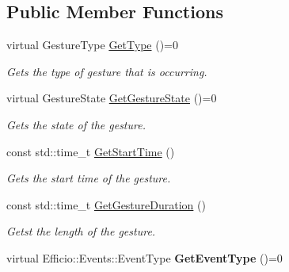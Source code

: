 \subsection*{Public Member Functions}
\begin{DoxyCompactItemize}
\item 
virtual Gesture\+Type \hyperlink{class_efficio_1_1_input_recognition_1_1_gesture_a751d03fe2bc9d025da065cec22936cd0}{Get\+Type} ()=0\hypertarget{class_efficio_1_1_input_recognition_1_1_gesture_a751d03fe2bc9d025da065cec22936cd0}{}\label{class_efficio_1_1_input_recognition_1_1_gesture_a751d03fe2bc9d025da065cec22936cd0}

\begin{DoxyCompactList}\small\item\em Gets the type of gesture that is occurring. \end{DoxyCompactList}\item 
virtual Gesture\+State \hyperlink{class_efficio_1_1_input_recognition_1_1_gesture_a0c607385ed5f969075f2e7a1eb11a85a}{Get\+Gesture\+State} ()=0\hypertarget{class_efficio_1_1_input_recognition_1_1_gesture_a0c607385ed5f969075f2e7a1eb11a85a}{}\label{class_efficio_1_1_input_recognition_1_1_gesture_a0c607385ed5f969075f2e7a1eb11a85a}

\begin{DoxyCompactList}\small\item\em Gets the state of the gesture. \end{DoxyCompactList}\item 
const std\+::time\+\_\+t \hyperlink{class_efficio_1_1_input_recognition_1_1_gesture_a22eb9d8533395b04d9f73b57afad09d6}{Get\+Start\+Time} ()\hypertarget{class_efficio_1_1_input_recognition_1_1_gesture_a22eb9d8533395b04d9f73b57afad09d6}{}\label{class_efficio_1_1_input_recognition_1_1_gesture_a22eb9d8533395b04d9f73b57afad09d6}

\begin{DoxyCompactList}\small\item\em Gets the start time of the gesture. \end{DoxyCompactList}\item 
const std\+::time\+\_\+t \hyperlink{class_efficio_1_1_input_recognition_1_1_gesture_a018fa00ce8db008e93fb988f649de9a6}{Get\+Gesture\+Duration} ()\hypertarget{class_efficio_1_1_input_recognition_1_1_gesture_a018fa00ce8db008e93fb988f649de9a6}{}\label{class_efficio_1_1_input_recognition_1_1_gesture_a018fa00ce8db008e93fb988f649de9a6}

\begin{DoxyCompactList}\small\item\em Getst the length of the gesture. \end{DoxyCompactList}\item 
virtual Efficio\+::\+Events\+::\+Event\+Type {\bfseries Get\+Event\+Type} ()=0\hypertarget{class_efficio_1_1_input_recognition_1_1_gesture_a2867983230c4bc6382e7b8e7e61215b6}{}\label{class_efficio_1_1_input_recognition_1_1_gesture_a2867983230c4bc6382e7b8e7e61215b6}

\end{DoxyCompactItemize}


